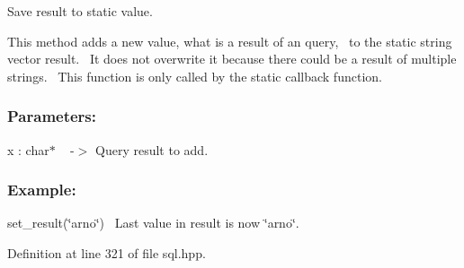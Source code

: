 Save result to static value. 

This method adds a new value, what is a result of an query,~\newline
to the static string vector result.~\newline
It does not overwrite it because there could be a result of multiple strings.~\newline
This function is only called by the static callback function.~\newline
 \subsubsection*{Parameters\+: }

x \+: char$\ast$ ~\newline
-\/$>$ Query result to add.

\subsubsection*{Example\+: }

set\+\_\+result(\char`\"{}arno\char`\"{})~\newline
Last value in result is now \char`\"{}arno\char`\"{}. 

Definition at line 321 of file sql.\+hpp.

